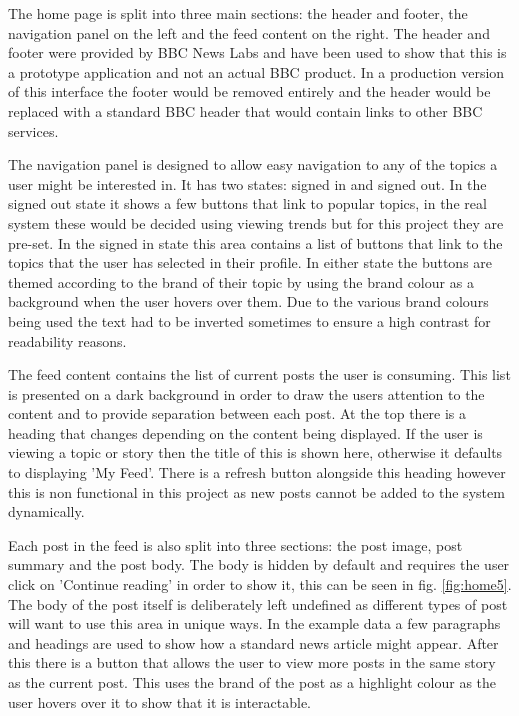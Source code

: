 \documentclass[12pt,titlepage]{article}
\begin{document}
    The home page is split into three main sections: the header and footer, the
    navigation panel on the left and the feed content on the right. The header
    and footer were provided by BBC News Labs and have been used to show that
    this is a prototype application and not an actual BBC product. In a
    production version of this interface the footer would be removed entirely
    and the header would be replaced with a standard BBC header that would
    contain links to other BBC services.

    The navigation panel is designed to allow easy navigation to any of the
    topics a user might be interested in. It has two states: signed in and
    signed out. In the signed out state it shows a few buttons that link to
    popular topics, in the real system these would be decided using viewing
    trends but for this project they are pre-set. In the signed in state this
    area contains a list of buttons that link to the topics that the user has
    selected in their profile. In either state the buttons are themed according
    to the brand of their topic by using the brand colour as a background when
    the user hovers over them. Due to the various brand colours being used the
    text had to be inverted sometimes to ensure a high contrast for readability
    reasons.

    The feed content contains the list of current posts the user is consuming.
    This list is presented on a dark background in order to draw the users
    attention to the content and to provide separation between each post. At the
    top there is a heading that changes depending on the content being
    displayed. If the user is viewing a topic or story then the title of this is
    shown here, otherwise it defaults to displaying 'My Feed'. There is a
    refresh button alongside this heading however this is non functional in this
    project as new posts cannot be added to the system dynamically.

    Each post in the feed is also split into three sections: the post image,
    post summary and the post body. The body is hidden by default and requires
    the user click on 'Continue reading' in order to show it, this can be seen
    in fig. \ref{fig:home5}. The body of the post itself is deliberately left
    undefined as different types of post will want to use this area in unique
    ways. In the example data a few paragraphs and headings are used to show how
    a standard news article might appear. After this there is a button that
    allows the user to view more posts in the same story as the current post.
    This uses the brand of the post as a highlight colour as the user hovers
    over it to show that it is interactable.
\end{document}
